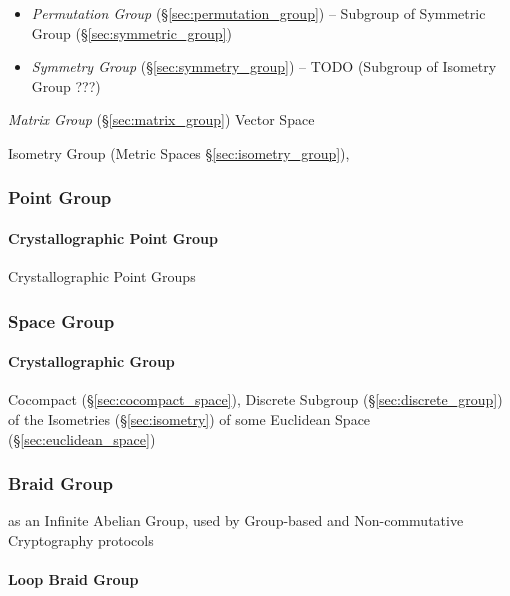 \begin{itemize}
  \item \emph{Permutation Group} (\S\ref{sec:permutation_group}) -- Subgroup of
    Symmetric Group (\S\ref{sec:symmetric_group})
  \item \emph{Symmetry Group} (\S\ref{sec:symmetry_group}) -- TODO (Subgroup of
    Isometry Group ???)
\end{itemize}

\emph{Matrix Group} (\S\ref{sec:matrix_group}) Vector Space

\fist Isometry Group (Metric Spaces \S\ref{sec:isometry_group}),



\subsubsection{Point Group}\label{sec:point_group}

\paragraph{Crystallographic Point Group}\label{sec:crystallographic_point_group}
\hfill

Crystallographic Point Groups



\subsubsection{Space Group}\label{sec:space_group}

\paragraph{Crystallographic Group}\label{sec:crystallographic_group}\hfill

Cocompact (\S\ref{sec:cocompact_space}), Discrete Subgroup
(\S\ref{sec:discrete_group}) of the Isometries (\S\ref{sec:isometry}) of some
Euclidean Space (\S\ref{sec:euclidean_space})



\subsubsection{Braid Group}\label{sec:braid_group}

as an Infinite Abelian Group, used by Group-based and Non-commutative
Cryptography protocols



\paragraph{Loop Braid Group}\label{sec:loop_braid_group}\hfill



